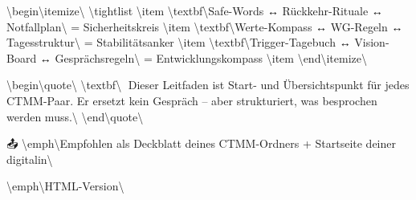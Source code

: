 \textbackslash{}begin\textbackslash{}{itemize\textbackslash{}}
\textbackslash{}tightlist
\textbackslash{}item
  \textbackslash{}textbf\textbackslash{}{Safe-Words ↔ Rückkehr-Rituale ↔ Notfallplan\textbackslash{}} = Sicherheitskreis
\textbackslash{}item
  \textbackslash{}textbf\textbackslash{}{Werte-Kompass ↔ WG-Regeln ↔ Tagesstruktur\textbackslash{}} = Stabilitätsanker
\textbackslash{}item
  \textbackslash{}textbf\textbackslash{}{Trigger-Tagebuch ↔ Vision-Board ↔ Gesprächsregeln\textbackslash{}} = Entwicklungskompass
\textbackslash{}item
\textbackslash{}end\textbackslash{}{itemize\textbackslash{}}

\textbackslash{}begin\textbackslash{}{quote\textbackslash{}}
\textbackslash{}textbf\textbackslash{}{📎 Dieser Leitfaden ist Start- und Übersichtspunkt für jedes CTMM-Paar. Er ersetzt kein Gespräch -- aber strukturiert, was besprochen werden muss.\textbackslash{}}
\textbackslash{}end\textbackslash{}{quote\textbackslash{}}

📤 \textbackslash{}emph\textbackslash{}{Empfohlen als Deckblatt deines CTMM-Ordners + Startseite deiner digitalin\textbackslash{}}

\textbackslash{}emph\textbackslash{}{HTML-Version\textbackslash{}}
